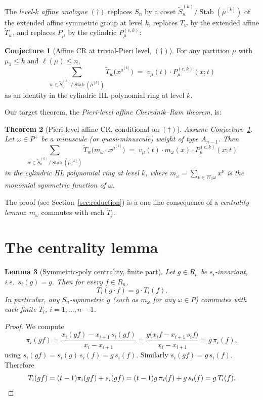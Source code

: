 \documentclass[11pt]{article}
\newtheorem{theorem}{Theorem}
\newtheorem{lemma}[theorem]{Lemma}
\theoremstyle{definition}
\newtheorem{conjecture}[theorem]{Conjecture}
\newcommand{\bmu}{\bar{\mu}}
\newcommand{\wt}[1]{\widetilde{#1}}
\newcommand{\Sn}{S_n}
\newcommand{\afSn}{\wt{S}_n}
\newcommand{\Stab}{\operatorname{Stab}}
\newcommand{\dgg}{\dagger}
\begin{document}
The \emph{level-$k$ affine analogue} $(\dgg)$ replaces $\Sn$ by a coset
$\afSn^{(k)}/\Stab(\bmu^{[k]})$ of the extended affine symmetric group at level $k$,
replaces $T_w$ by the extended affine $\wt T_w$, and replaces $P_\mu$ by the
cylindric $P^{(c,k)}_\mu$:
\begin{conjecture}[Affine CR at trivial-Pieri level, $(\dgg)$]\label{conj:daggger}
For any partition $\mu$ with $\mu_1 \le k$ and $\ell(\mu) \le n$,
\begin{equation}
\sum_{w \in \afSn^{(k)}/\Stab(\bmu^{[k]})}
   \wt T_w\bigl(x^{\bmu^{[k]}}\bigr)
   \;=\; v_\mu(t)\cdot P^{(c,k)}_\mu(x;t)
\label{eq:dagger}
\end{equation}
as an identity in the cylindric HL polynomial ring at level $k$.
\end{conjecture}

Our target theorem, the \emph{Pieri-level affine Cherednik--Ram theorem}, is:
\begin{theorem}[Pieri-level affine CR, conditional on $(\dgg)$]\label{thm:pieri-target}
Assume Conjecture~\ref{conj:daggger}. Let $\omega \in P^+$ be a minuscule
(or quasi-minuscule) weight of type $A_{n-1}$. Then
\begin{equation}
\sum_{w \in \afSn^{(k)}/\Stab(\bmu^{[k]})}
   \wt T_w\bigl(m_\omega \cdot x^{\bmu^{[k]}}\bigr)
   \;=\; v_\mu(t)\cdot m_\omega(x) \cdot P^{(c,k)}_\mu(x;t)
\label{eq:target}
\end{equation}
in the cylindric HL polynomial ring at level $k$, where
$m_\omega = \sum_{\nu \in W_0\omega} x^\nu$ is the monomial symmetric
function of $\omega$.
\end{theorem}

The proof (see Section~\ref{sec:reduction}) is a one-line consequence of a
\emph{centrality lemma}: $m_\omega$ commutes with each $\wt T_j$.

\section{The centrality lemma}
\label{sec:centrality}

\begin{lemma}[Symmetric-poly centrality, finite part]\label{lem:central-finite}
Let $g \in R_n$ be $s_i$-invariant, i.e.\ $s_i(g) = g$. Then for every $f \in R_n$,
\[
T_i(g\cdot f) = g \cdot T_i(f).
\]
In particular, any $\Sn$-symmetric $g$ (such as $m_\omega$ for any $\omega \in P$)
commutes with each finite $T_i$, $i = 1, \ldots, n-1$.
\end{lemma}
\begin{proof}
We compute
\[
\pi_i(gf)
= \frac{x_i (gf) - x_{i+1}\, s_i(gf)}{x_i - x_{i+1}}
= \frac{g\bigl(x_i f - x_{i+1}\, s_i f\bigr)}{x_i - x_{i+1}}
= g \, \pi_i(f),
\]
using $s_i(gf) = s_i(g)\, s_i(f) = g\, s_i(f)$. Similarly $s_i(gf) = g\, s_i(f)$.
Therefore
\[
T_i(gf) = (t-1)\pi_i(gf) + s_i(gf) = (t-1) g\, \pi_i(f) + g\, s_i(f) = g\, T_i(f). \qedhere
\]
\end{proof}
\end{document}
